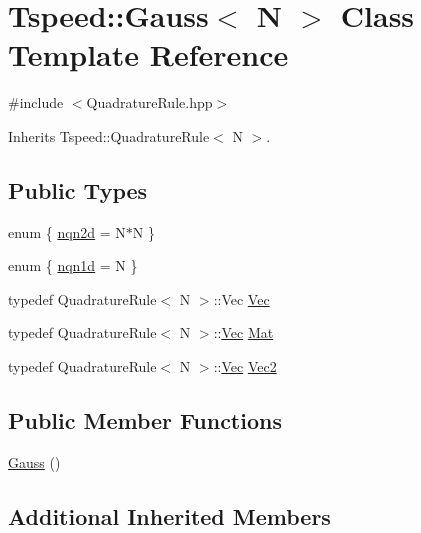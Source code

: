 \hypertarget{classTspeed_1_1Gauss}{\section{Tspeed\-:\-:Gauss$<$ N $>$ Class Template Reference}
\label{classTspeed_1_1Gauss}
}


{\ttfamily \#include $<$Quadrature\-Rule.\-hpp$>$}



Inherits Tspeed\-::\-Quadrature\-Rule$<$ N $>$.

\subsection*{Public Types}
\begin{DoxyCompactItemize}
\item 
enum \{ \hyperlink{classTspeed_1_1Gauss_a91d11e695996fb9038422fdd0d3065aaa13cac1428f86f136e6ed539e3eba50c1}{nqn2d} = N$\ast$\-N
 \}
\item 
enum \{ \hyperlink{classTspeed_1_1Gauss_a501ad3412838918f9e2301655f64eafeadbbfd28e9b0adcf7dfae2dd2b344ff62}{nqn1d} = N
 \}
\item 
typedef Quadrature\-Rule$<$ N $>$\-::Vec \hyperlink{classTspeed_1_1Gauss_aa7e6ce3b329db121166dc94669eeb64c}{Vec}
\item 
typedef Quadrature\-Rule$<$ N $>$\-::\hyperlink{classTspeed_1_1Gauss_aa7e6ce3b329db121166dc94669eeb64c}{Vec} \hyperlink{classTspeed_1_1Gauss_a60a04af13bc0e53cfae47226d1d3e6c2}{Mat}
\item 
typedef Quadrature\-Rule$<$ N $>$\-::\hyperlink{classTspeed_1_1Gauss_aa7e6ce3b329db121166dc94669eeb64c}{Vec} \hyperlink{classTspeed_1_1Gauss_ae0f9176585d652260498c0b142b183eb}{Vec2}
\end{DoxyCompactItemize}
\subsection*{Public Member Functions}
\begin{DoxyCompactItemize}
\item 
\hyperlink{classTspeed_1_1Gauss_a0bcffd5c12cefd767a96a597c3c250ce}{Gauss} ()
\end{DoxyCompactItemize}
\subsection*{Additional Inherited Members}


